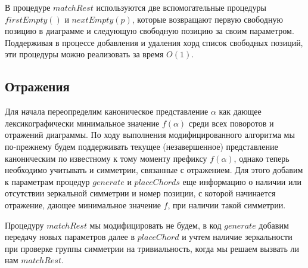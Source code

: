 \documentclass[a4paper,12pt]{article}
\theoremstyle{plain}
\theoremstyle{definition}
\begin{document}
В процедуре $matchRest$ используются две вспомогательные процедуры $firstEmpty()$ и $nextEmpty(p)$, которые возвращают первую
свободную позицию в диаграмме и следующую свободную позицию за своим параметром. Поддерживая в процессе добавления и удаления
хорд список свободных позиций, эти процедуры можно реализовать за время $O(1)$.

\subsection{Отражения}

Для начала переопределим каноническое представление $\alpha$ как дающее лексикографически минимальное значение $f(\alpha)$
среди всех поворотов и отражений диаграммы. По ходу выполнения модифицированного алгоритма мы по-прежнему будем поддерживать
текущее (незавершенное) представление каноническим по известному к тому моменту префиксу $f(\alpha)$, однако теперь необходимо
учитывать и симметрии, связанные с отражением. Для этого добавим к параметрам процедур $generate$ и $placeChords$ еще
информацию о наличии или отсутствии зеркальной симметрии и номер позиции, с которой начинается отражение, дающее минимальное
значение $f$, при наличии такой симметрии.

Процедуру $matchRest$ мы модифицировать не будем, в код $generate$ добавим передачу новых параметров далее в $placeChord$ и
учтем наличие зеркальности при проверке группы симметрии на тривиальность, когда мы решаем вызвать ли нам $matchRest$.
\end{document}
